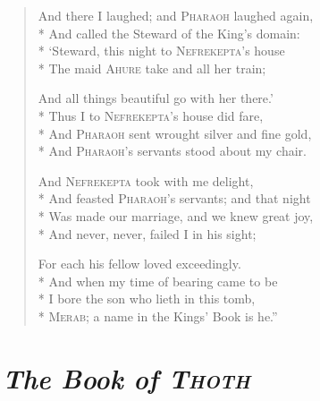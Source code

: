 \documentclass[12pt]{article}
\newcommand{\vin}{\hspace{1em}}
\begin{document}
\begin{verse}
And there I laughed; and \textsc{Pharaoh} laughed again,\\*
And called the Steward of the King's domain:\\*
\vin `Steward, this night to \textsc{Nefrekepta}'s house\\*
The maid \textsc{Ahure} take and all her train;

And all things beautiful go with her there.'\\*
Thus I to \textsc{Nefrekepta}'s house did fare,\\*
\vin And \textsc{Pharaoh} sent wrought silver and fine gold,\\*
And \textsc{Pharaoh}'s servants stood about my chair.

And \textsc{Nefrekepta} took with me delight,\\*
And feasted \textsc{Pharaoh}'s servants; and that night\\*
\vin Was made our marriage, and we knew great joy,\\*
And never, never, failed I in his sight;

For each his fellow loved exceedingly.\\*
And when my time of bearing came to be\\*
\vin I bore the son who lieth in this tomb,\\*
\textsc{Merab}; a name in the Kings' Book is he.''
\end{verse}


\section*{\mdseries\itshape The Book of \textsc{Thoth}}
\end{document}
